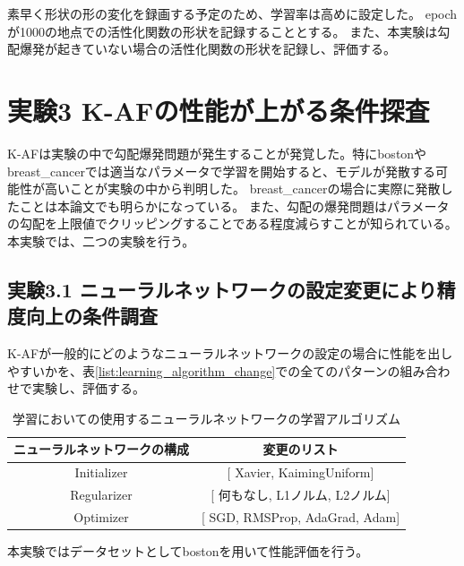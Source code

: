 素早く形状の形の変化を録画する予定のため、学習率は高めに設定した。
epochが1000の地点での活性化関数の形状を記録することとする。
また、本実験は勾配爆発が起きていない場合の活性化関数の形状を記録し、評価する。



\section{実験3 K-AFの性能が上がる条件探査}
\label{exp3}
K-AFは実験の中で勾配爆発問題が発生することが発覚した。特にbostonやbreast\_cancerでは適当なパラメータで学習を開始すると、モデルが発散する可能性が高いことが実験の中から判明した。
breast\_cancerの場合に実際に発散したことは本論文でも明らかになっている。
また、勾配の爆発問題はパラメータの勾配を上限値でクリッピングすることである程度減らすことが知られている。
本実験では、二つの実験を行う。

\subsection{実験3.1 ニューラルネットワークの設定変更により精度向上の条件調査}
\label{exp3.1}
K-AFが一般的にどのようなニューラルネットワークの設定の場合に性能を出しやすいかを、表\ref{list:learning_algorithm_change}での全てのパターンの組み合わせで実験し、評価する。



\begin{table}[htbp]
    \begin{center}
        \caption{学習においての使用するニューラルネットワークの学習アルゴリズム}
        \label{list:learning_algorithm_change:exp3}
        \vspace{2mm} 
        \begin{tabular}{ |c|c| }
        \hline
        ニューラルネットワークの構成 & 変更のリスト \\
        \hline
        Initializer         & [ Xavier, KaimingUniform]   \\
        \hline
        Regularizer           & [ 何もなし, L1ノルム, L2ノルム]     \\
        \hline
        Optimizer         & [ SGD, RMSProp, AdaGrad, Adam]   \\
        \hline
        \end{tabular}
    \end{center}
\end{table}



本実験ではデータセットとしてbostonを用いて性能評価を行う。

